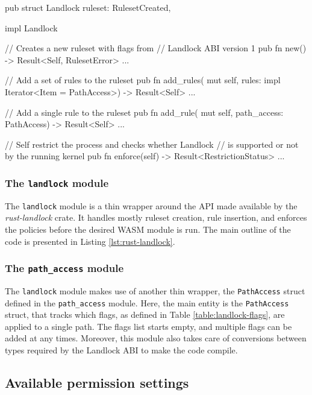 \begin{code}[language=Rust, caption=The outline of the \texttt{landlock} module., label=lst:rust-landlock]
pub struct Landlock {
  ruleset: RulesetCreated,
}

impl Landlock {
  // Creates a new ruleset with flags from
  // Landlock ABI version 1
  pub fn new() -> Result<Self, RulesetError> {...}

  // Add a set of rules to the ruleset
  pub fn add_rules(
    mut self,
    rules: impl Iterator<Item = PathAccess>)
    -> Result<Self>
  {...}

  // Add a single rule to the ruleset
  pub fn add_rule(
    mut self,
    path_access: PathAccess) -> Result<Self>
  {...}

  // Self restrict the process and checks whether Landlock
  // is supported or not by the running kernel
  pub fn enforce(self) -> Result<RestrictionStatus>
  {...}
}
\end{code}

\subsubsection{The \texttt{landlock} module}

The \texttt{landlock} module is a thin wrapper around the API made available by the \textit{rust-landlock} crate.
It handles mostly ruleset creation, rule insertion, and enforces the policies before the desired WASM module is run.
The main outline of the code is presented in Listing \ref{lst:rust-landlock}.

\subsubsection{The \texttt{path\_access} module}

The \texttt{landlock} module makes use of another thin wrapper, the \texttt{PathAccess} struct defined
in the \texttt{path\_access} module.
Here, the main entity is the \texttt{PathAccess} struct, that tracks which flags, as defined in Table \ref{table:landlock-flags},
are applied to a single path. The flags list starts empty, and multiple flags can be added at any times.
Moreover, this module also takes care of conversions between types required by the Landlock ABI to make the code compile.

\subsection{Available permission settings}

